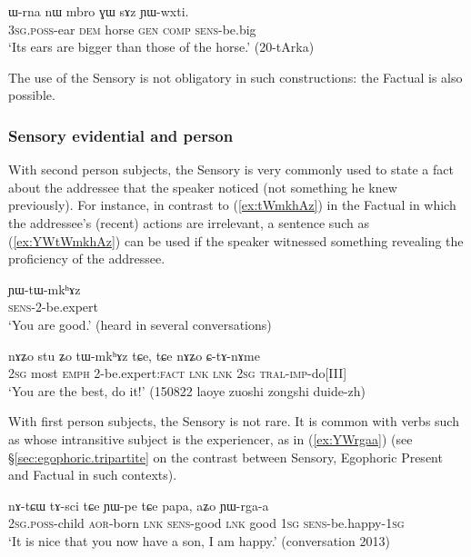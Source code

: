 \begin{exe}
\ex \label{ex:sAz.YWwxti}
\gll ɯ-rna nɯ mbro ɣɯ sɤz ɲɯ-wxti. \\
\textsc{3sg}.\textsc{poss}-ear \textsc{dem} horse \textsc{gen} \textsc{comp} \textsc{sens}-be.big \\
\glt `Its ears are bigger than those of the horse.'  (20-tArka)
\end{exe}

The use of the Sensory is not obligatory in such constructions: the Factual is also possible. 

\subsubsection{Sensory evidential and person} \label{sec:sensory.person}
With second person subjects, the Sensory is very commonly used to state a fact about the addressee that the speaker noticed (not something he knew previously). For instance, in contrast to (\ref{ex:tWmkhAz}) in the Factual in which the addressee's (recent) actions are irrelevant, a sentence such as (\ref{ex:YWtWmkhAz}) can be used if the speaker witnessed something revealing the proficiency of the addressee.

\begin{exe}
\ex \label{ex:YWtWmkhAz}
\gll  ɲɯ-tɯ-mkʰɤz \\
\textsc{sens}-2-be.expert \\
\glt `You are good.' (heard in several conversations)
\end{exe}

\begin{exe}
\ex \label{ex:tWmkhAz}
\gll nɤʑo stu ʑo tɯ-mkʰɤz tɕe, tɕe nɤʑo ɕ-tɤ-nɤme \\
\textsc{2sg} most \textsc{emph} 2-be.expert:\textsc{fact}   \textsc{lnk} \textsc{lnk} \textsc{2sg} \textsc{tral}-\textsc{imp}-do[III] \\
\glt `You are the best, do it!' (150822 laoye zuoshi zongshi duide-zh)
\end{exe}

With first person subjects, the Sensory is not rare. It is common with verbs such as  whose intransitive subject is the experiencer, as in (\ref{ex:YWrgaa}) (see §\ref{sec:egophoric.tripartite} on the contrast between Sensory, Egophoric Present and Factual in such contexts).

\begin{exe}
\ex \label{ex:YWrgaa}
\gll nɤ-tɕɯ tɤ-sci tɕe ɲɯ-pe tɕe papa, aʑo ɲɯ-rga-a\\
 \textsc{2sg}.\textsc{poss}-child \textsc{aor}-born \textsc{lnk} \textsc{sens}-good \textsc{lnk} good  \textsc{1sg} \textsc{sens}-be.happy-\textsc{1sg}\\
\glt `It is nice that you now have a son, I am happy.' (conversation 2013)
\end{exe}

